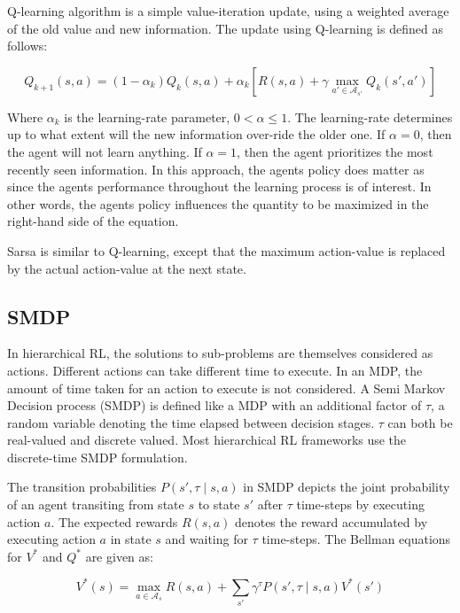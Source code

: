 Q-learning algorithm is a simple value-iteration update, using a weighted average of the old value and new information. The update using Q-learning is defined as follows:

\begin{equation}
    Q_{k+1} (s,a)=(1-\alpha_k ) Q_k (s,a)+\alpha_k[R(s,a)+\gamma   \max_{a' \in \mathcal{A}_{s'}}⁡ Q_k (s',a' )]
\end{equation}

Where \(\alpha_k\) is the learning-rate parameter, \(0 < \alpha \leq 1\). The learning-rate determines up to what extent will the new information over-ride the older one. If \(\alpha=0\), then the agent will not learn anything. If \(\alpha=1\), then the agent prioritizes the most recently seen information. In this approach, the agents policy does matter as since the agents performance throughout the learning process is of interest. In other words, the agents policy influences the quantity to be maximized in the right-hand side of the equation. 

Sarsa is similar to Q-learning, except that the maximum action-value is replaced by the actual action-value at the next state.



\subsection{SMDP}

In hierarchical RL, the solutions to sub-problems are themselves considered as actions. Different actions can take different time to execute. In an MDP, the amount of time taken for an action to execute is not considered. A Semi Markov Decision process (SMDP) is defined like a MDP with an additional factor of \(\tau\), a random variable denoting the time elapsed between decision stages. \(\tau\) can both be real-valued and discrete valued. Most hierarchical RL frameworks use the discrete-time SMDP formulation. 

The transition probabilities \(P(s', \tau \mid s,a)\) in SMDP depicts the joint probability of an agent transiting from state \(s\) to state \(s'\)  after \(\tau\) time-steps by executing action \(a\). The expected rewards \(R(s,a)\) denotes the reward accumulated by executing action \(a\) in state \(s\) and waiting for \(\tau\) time-steps. The Bellman equations for \(V^*\) and \(Q^*\) are given as:

\begin{equation}
    V^* (s)=   \max_{a \in \mathcal{A}_s }⁡ R(s,a)   + \sum_{s'} \gamma^\tau P(s',\tau \mid s,a) V^* (s')
\end{equation}

